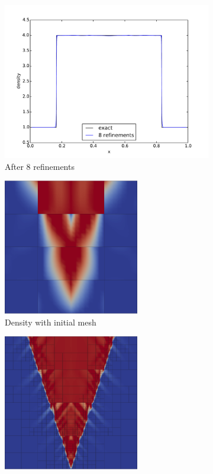 \documentclass[preprint,12pt]{elsarticle}
\begin{document}
\begin{figure}[p]
\begin{subfigure}[c]{0.3\textwidth}
\includegraphics[width=\textwidth]{SpaceTimeCNS/Noh1e-3/den9.pdf}
\caption{After 8 refinements}
\label{fig:noh_den8}
\end{subfigure}
\begin{subfigure}[c]{0.45\textwidth}
\centering
\includegraphics[width=0.65\textwidth]{SpaceTimeCNS/Noh1e-3/mesh1.png}
\caption{Density with initial mesh}
\label{fig:noh_mesh0}
\end{subfigure}
\begin{subfigure}[c]{0.45\textwidth}
\centering
\includegraphics[width=0.65\textwidth]{SpaceTimeCNS/Noh1e-3/mesh5.png}

\end{subfigure}
\end{figure}
\end{document}
